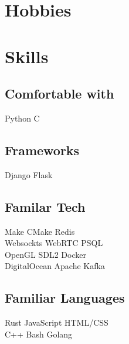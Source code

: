\documentclass[]{resume-openfont}
\begin{document}
\begin{minipage}[t]{0.33\textwidth}
\section{Hobbies}
\sectionsep

\vspace{-2mm} %

\section{Skills}
\subsection{Comfortable with}
Python \textbullet{} C
\sectionsep
\subsection{Frameworks}
Django \textbullet{} Flask
\sectionsep
\subsection{Familar Tech}
Make \textbullet{} CMake \textbullet{} Redis\\
Websockts \textbullet{} WebRTC \textbullet{} PSQL\\
OpenGL \textbullet{} SDL2 \textbullet{} Docker\\
DigitalOcean \textbullet{} Apache Kafka
\sectionsep
\subsection{Familiar Languages}
Rust \textbullet{} JavaScript\textbullet{} HTML/CSS \\
C++ \textbullet{} Bash \textbullet{} Golang
\sectionsep

%
%

\end{minipage}
\hfill
\end{document}
